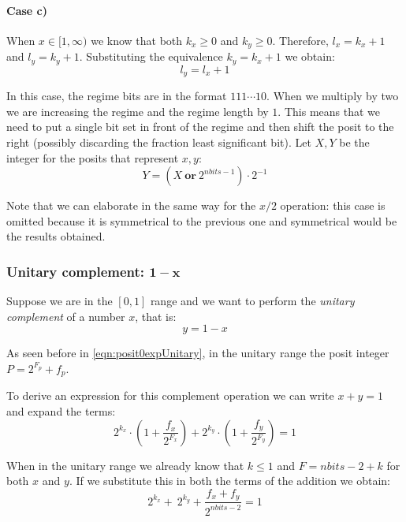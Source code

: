 \paragraph{Case c)} When $x \in [1,\infty)$ we know that both $k_x \geq 0$ and $k_y \geq 0$. Therefore, $l_x = k_x + 1$ and $l_y = k_y + 1$. Substituting the equivalence $k_y = k_x + 1$ we obtain:
\begin{equation}
    l_y = l_x + 1
\end{equation}

In this case, the regime bits are in the format $111 \cdots 10$. When we multiply by two we are increasing the regime and the regime length by $1$. This means that we need to put a single bit set in front of the regime and then shift the posit to the right (possibly discarding the fraction least significant bit). Let $X,Y$ be the integer for the posits that represent $x,y$:
\begin{equation}
    Y = (X\ \mathbf{or}\ 2^{nbits - 1}) \cdot 2^{-1}
\end{equation}

Note that we can elaborate in the same way for the $x/2$ operation: this case is omitted because it is symmetrical to the previous one and symmetrical would be the results obtained. 



\subsubsection{Unitary complement: $\mathbf{1-x}$}

Suppose we are in the $[0,1]$ range and we want to perform the \textit{unitary complement} of a number $x$, that is:
\begin{equation}
    y = 1 - x    
\end{equation}

As seen before in \eqref{eqn:posit0expUnitary}, in the unitary range the posit integer $P = 2^{F_p} + f_p$. 

To derive an expression for this complement operation we can write $x + y = 1$ and expand the terms:
\begin{equation}
    2^{k_x} \cdot \left(1 + \frac{f_x}{2^{F_x}} \right) + 2^{k_y} \cdot \left(1 + \frac{f_y}{2^{F_y}} \right) = 1
\end{equation}

When in the unitary range we already know that $k \leq 1$ and $F = nbits - 2 + k$ for both $x$ and $y$. If we substitute this in both the terms of the addition we obtain:
\begin{equation}
    2^{k_x} + \ 2^{k_y} + \frac{f_x + f_y}{2^{nbits - 2}} = 1
\end{equation}

